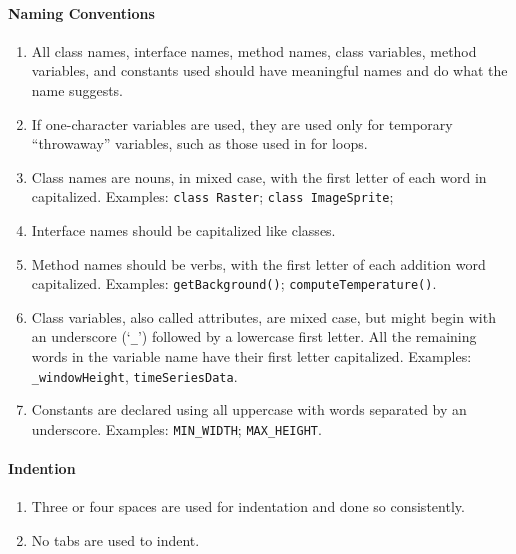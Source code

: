 \paragraph*{Naming Conventions}\begin{enumerate}	
\item All class names, interface names, method names, class variables, method variables, and constants used should have meaningful names and do what the name suggests.
\item If one-character variables are used, they are used only for temporary ``throwaway'' variables, such as those used in for loops.
\item Class names are nouns, in mixed case, with the first letter of each word in capitalized. Examples: \texttt{class Raster}; \texttt{class ImageSprite};
\item Interface names should be capitalized like classes.
\item Method names should be verbs, with the first letter of each addition word capitalized. Examples: \texttt{getBackground()}; \texttt{computeTemperature()}.
\item Class variables, also called attributes, are mixed case, but might begin with an underscore (`\texttt{\_}') followed by a lowercase first letter. All the remaining words in the variable name have their first letter capitalized. Examples: \texttt{\_windowHeight}, \texttt{timeSeriesData}.
\item Constants are declared using all uppercase with words separated by an underscore. Examples: \texttt{MIN\_WIDTH}; \texttt{MAX\_HEIGHT}.
\end{enumerate}

\paragraph*{Indention}\begin{enumerate}[resume]
\item Three or four spaces are used for indentation and done so consistently.
\item No tabs are used to indent.
\end{enumerate}

